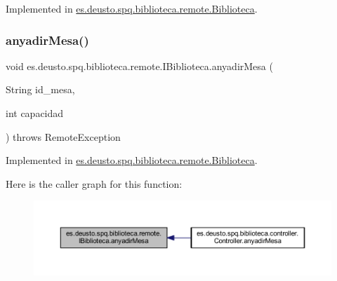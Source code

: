 Implemented in \mbox{\hyperlink{classes_1_1deusto_1_1spq_1_1biblioteca_1_1remote_1_1_biblioteca_a144845bc1e837e9cb6a329ac30adbf39}{es.\+deusto.\+spq.\+biblioteca.\+remote.\+Biblioteca}}.

\mbox{\label{interfacees_1_1deusto_1_1spq_1_1biblioteca_1_1remote_1_1_i_biblioteca_a99ba473aaaa6ff064cff2f354c3f64b3}} 
\subsubsection{\texorpdfstring{anyadir\+Mesa()}{anyadirMesa()}}
{\footnotesize\ttfamily void es.\+deusto.\+spq.\+biblioteca.\+remote.\+I\+Biblioteca.\+anyadir\+Mesa (\begin{DoxyParamCaption}\item[{String}]{id\+\_\+mesa,  }\item[{int}]{capacidad }\end{DoxyParamCaption}) throws Remote\+Exception}



Implemented in \mbox{\hyperlink{classes_1_1deusto_1_1spq_1_1biblioteca_1_1remote_1_1_biblioteca_a5cfc021da6e151681f153a974177d2e7}{es.\+deusto.\+spq.\+biblioteca.\+remote.\+Biblioteca}}.

Here is the caller graph for this function\+:
\nopagebreak
\begin{figure}[H]
\begin{center}
\leavevmode
\includegraphics[width=350pt]{interfacees_1_1deusto_1_1spq_1_1biblioteca_1_1remote_1_1_i_biblioteca_a99ba473aaaa6ff064cff2f354c3f64b3_icgraph}
\end{center}
\end{figure}
\mbox{\label{interfacees_1_1deusto_1_1spq_1_1biblioteca_1_1remote_1_1_i_biblioteca_a4d0efe1c5a592db92d9b416f59ac8d9a}} 
